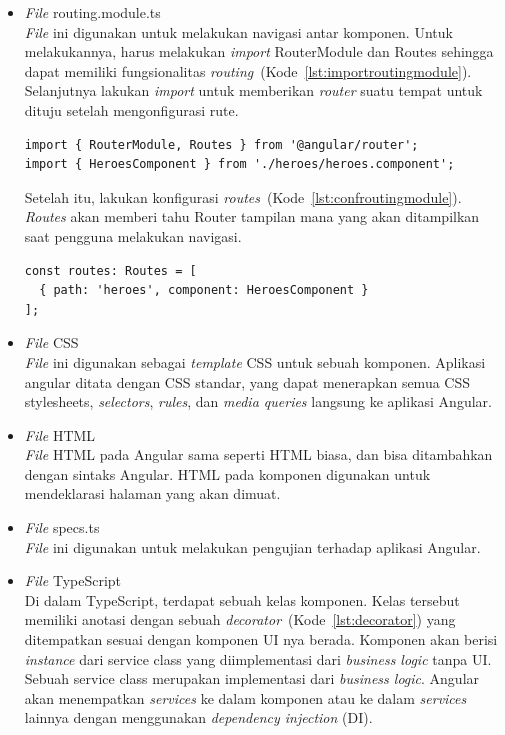 \begin{itemize}
	\item \textit{File} routing.module.ts \\
		\textit{File} ini digunakan untuk melakukan navigasi antar komponen. Untuk melakukannya, harus melakukan \textit{import} RouterModule dan Routes sehingga dapat memiliki fungsionalitas \textit{routing}~(Kode~\ref{lst:importroutingmodule}). Selanjutnya lakukan \textit{import} untuk memberikan \textit{router} suatu tempat untuk dituju setelah mengonfigurasi rute.

\begin{lstlisting}[label={lst:importroutingmodule}, caption=Contoh \textit{import} pada routing.module.ts]
import { RouterModule, Routes } from '@angular/router';
import { HeroesComponent } from './heroes/heroes.component';
\end{lstlisting} 

		Setelah itu, lakukan konfigurasi \textit{routes}~(Kode~\ref{lst:confroutingmodule}). \textit{Routes} akan memberi tahu Router tampilan mana yang akan ditampilkan saat pengguna melakukan navigasi.
		
\begin{lstlisting}[label={lst:confroutingmodule}, caption=Contoh Konfigurasi \textit{Routes} pada routing.module.ts]
const routes: Routes = [
  { path: 'heroes', component: HeroesComponent }
];
\end{lstlisting} 

	\item \textit{File} CSS \\
		\textit{File} ini digunakan sebagai \textit{template} CSS untuk sebuah komponen. Aplikasi angular ditata dengan CSS standar, yang dapat menerapkan  semua CSS stylesheets, \textit{selectors}, \textit{rules}, dan \textit{media queries} langsung ke aplikasi Angular.
		 
	\item \textit{File} HTML \\
		\textit{File} HTML pada Angular sama seperti HTML biasa, dan bisa ditambahkan dengan sintaks Angular. HTML pada komponen digunakan untuk mendeklarasi halaman yang akan dimuat.
		
	\item \textit{File} specs.ts \\
		\textit{File} ini digunakan untuk melakukan pengujian terhadap aplikasi Angular. 
		
	\item \textit{File} TypeScript \\
		Di dalam TypeScript, terdapat sebuah kelas komponen. Kelas tersebut memiliki anotasi dengan sebuah \textit{decorator}~(Kode~\ref{lst:decorator}) yang ditempatkan sesuai dengan komponen UI nya berada. Komponen akan berisi \textit{instance} dari service class yang diimplementasi dari \textit{business logic} tanpa UI. Sebuah service class merupakan implementasi dari \textit{business logic}. Angular akan menempatkan \textit{services} ke dalam komponen atau ke dalam \textit{services} lainnya dengan menggunakan \textit{dependency injection} (DI). 	


\end{itemize}
